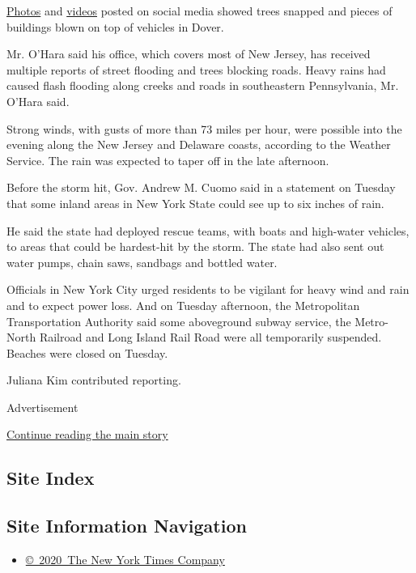 \href{https://twitter.com/RichWirdzekWx/status/1290684400825438208}{Photos}
and
\href{https://twitter.com/DKDRinc/status/1290688365830995969}{videos}
posted on social media showed trees snapped and pieces of buildings
blown on top of vehicles in Dover.

Mr. O'Hara said his office, which covers most of New Jersey, has
received multiple reports of street flooding and trees blocking roads.
Heavy rains had caused flash flooding along creeks and roads in
southeastern Pennsylvania, Mr. O'Hara said.

Strong winds, with gusts of more than 73 miles per hour, were possible
into the evening along the New Jersey and Delaware coasts, according to
the Weather Service. The rain was expected to taper off in the late
afternoon.

Before the storm hit, Gov. Andrew M. Cuomo said in a statement on
Tuesday that some inland areas in New York State could see up to six
inches of rain.

He said the state had deployed rescue teams, with boats and high-water
vehicles, to areas that could be hardest-hit by the storm. The state had
also sent out water pumps, chain saws, sandbags and bottled water.

Officials in New York City urged residents to be vigilant for heavy wind
and rain and to expect power loss. And on Tuesday afternoon, the
Metropolitan Transportation Authority said some aboveground subway
service, the Metro-North Railroad and Long Island Rail Road were all
temporarily suspended. Beaches were closed on Tuesday.

Juliana Kim contributed reporting.

Advertisement

\protect\hyperlink{after-bottom}{Continue reading the main story}

\hypertarget{site-index}{%
\subsection{Site Index}\label{site-index}}

\hypertarget{site-information-navigation}{%
\subsection{Site Information
Navigation}\label{site-information-navigation}}

\begin{itemize}
\tightlist
\item
  \href{https://help.nytimes.com/hc/en-us/articles/115014792127-Copyright-notice}{©~2020~The
  New York Times Company}
\end{itemize}

